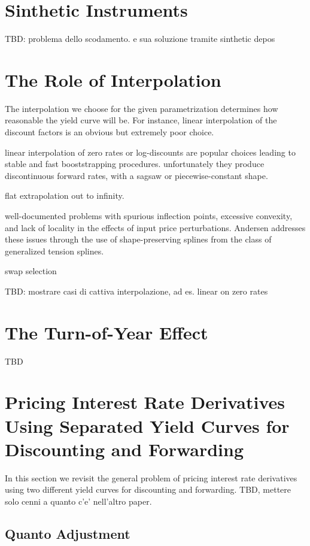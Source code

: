 \documentclass[11pt,reqno]{amsart}
\begin{document}
\section{Sinthetic Instruments}

TBD:
problema dello scodamento. e sua soluzione tramite sinthetic depos


\section{The Role of Interpolation}

The interpolation we choose for the given parametrization determines how
reasonable the yield curve will be. For instance, linear interpolation of
the discount factors is an obvious but extremely poor choice.

linear interpolation of zero rates or log-discounts are popular choices
leading to stable and fast booststrapping procedures. unfortunately they
produce discontinuous forward rates, with a sagsaw or piecewise-constant
shape.

flat extrapolation out to infinity.

well-documented problems with spurious inflection points, excessive
convexity, and lack of locality in the effects of input price perturbations.
Andersen \cite{Andersen2005} addresses these issues through the use of
shape-preserving splines from the class of generalized tension splines.

swap selection

TBD: mostrare casi di cattiva interpolazione, ad es. linear on zero rates


\section{The Turn-of-Year Effect}

TBD

\section{Pricing Interest Rate Derivatives Using Separated Yield Curves for
Discounting and Forwarding}

In this section we revisit the general problem of pricing interest rate derivatives using two different yield curves for discounting and forwarding. 
TBD, mettere solo cenni a quanto c'e' nell'altro paper.


\subsection{Quanto Adjustment}
\end{document}
